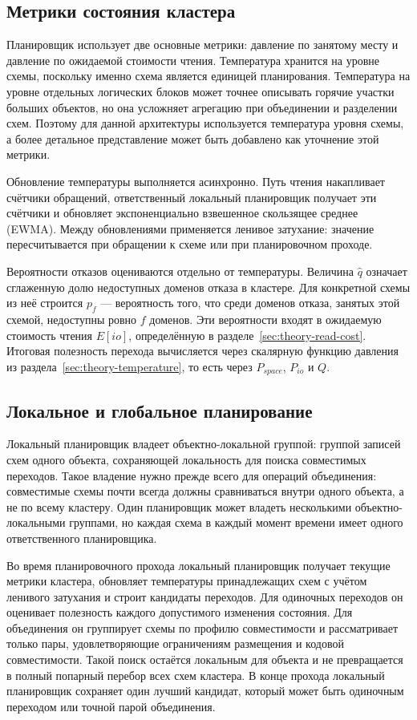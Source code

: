 \subsection{Метрики состояния кластера}

Планировщик использует две основные метрики: давление по занятому месту и
давление по ожидаемой стоимости чтения. Температура хранится на уровне схемы,
поскольку именно схема является единицей планирования. Температура на уровне
отдельных логических блоков может точнее описывать горячие участки больших
объектов, но она усложняет агрегацию при объединении и разделении схем.
Поэтому для данной архитектуры используется температура уровня схемы, а более
детальное представление может быть добавлено как уточнение этой метрики.

Обновление температуры выполняется асинхронно. Путь чтения накапливает счётчики
обращений, ответственный локальный планировщик получает эти счётчики и
обновляет экспоненциально взвешенное скользящее среднее (EWMA). Между
обновлениями применяется ленивое затухание: значение пересчитывается при
обращении к схеме или при планировочном проходе.

Вероятности отказов оцениваются отдельно от температуры. Величина \(\hat q\)
означает сглаженную долю недоступных доменов отказа в кластере. Для конкретной
схемы из неё строится \(p_f\) --- вероятность того, что среди доменов отказа,
занятых этой схемой, недоступны ровно \(f\) доменов. Эти вероятности входят в
ожидаемую стоимость чтения \(E[io]\), определённую в
разделе~\ref{sec:theory-read-cost}. Итоговая полезность перехода вычисляется
через скалярную функцию давления из раздела~\ref{sec:theory-temperature}, то
есть через \(P_{space}\), \(P_{io}\) и \(Q\).

\subsection{Локальное и глобальное планирование}

Локальный планировщик владеет объектно-локальной группой: группой записей схем
одного объекта, сохраняющей локальность для поиска совместимых переходов. Такое
владение нужно прежде всего для операций объединения: совместимые схемы почти
всегда должны сравниваться внутри одного объекта, а не по всему кластеру. Один
планировщик может владеть несколькими объектно-локальными группами, но каждая
схема в каждый момент времени имеет одного ответственного планировщика.

Во время планировочного прохода локальный планировщик получает текущие метрики
кластера, обновляет температуры принадлежащих схем с учётом ленивого затухания
и строит кандидаты переходов. Для одиночных переходов он оценивает полезность
каждого допустимого изменения состояния. Для объединения он группирует схемы по
профилю совместимости и рассматривает только пары, удовлетворяющие ограничениям
размещения и кодовой совместимости. Такой поиск остаётся локальным для объекта
и не превращается в полный попарный перебор всех схем кластера. В конце прохода
локальный планировщик сохраняет один лучший кандидат, который может быть
одиночным переходом или точной парой объединения.


